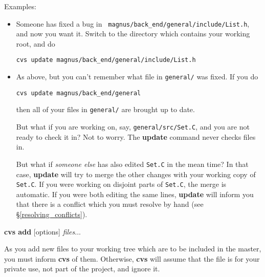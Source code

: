 \begin{description}
Examples:

\begin{itemize}

\item
Someone has fixed a bug in {\tt
magnus/back\_end/general/include/List.h}, and now you want it.
Switch to the directory which contains your working root, and do

\vspace{8pt}

{\tt cvs update magnus/back\_end/general/include/List.h}

\vspace{8pt}

\item
As above, but you can't remember what file in {\tt general/} was
fixed.  If you do

\vspace{8pt}

{\tt cvs update magnus/back\_end/general}

\vspace{8pt}

\noindent then all of your files in {\tt general/} are brought up to date.

\vspace{8pt}

But what if you are working on, say, {\tt general/src/Set.C}, and you
are not ready to check it in? Not to worry. The {\bf update} command
never checks files in.

\vspace{8pt}

But what if {\em someone else} has also edited {\tt Set.C} in the mean
time? In that case, {\bf update} will try to merge the other changes
with your working copy of {\tt Set.C}. If you were working on disjoint
parts of {\tt Set.C}, the merge is automatic. If you were both editing
the same lines, {\bf update} will inform you that there is a conflict
which you must resolve by hand (see \S\ref{resolving_conflicts}).

\end{itemize}



\item{{\bf cvs add} [options] {\em files}...}

As you add new files to your working tree which are to be included in
the master, you must inform {\bf cvs} of them. Otherwise, {\bf cvs}
will assume that the file is for your private use, not part of the
project, and ignore it.


\end{description}
